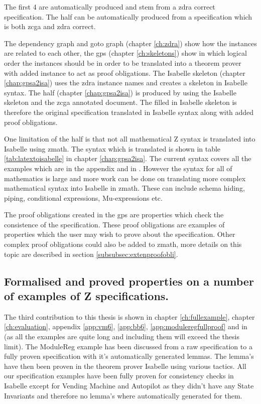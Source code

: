 The first 4 are automatically produced and stem from a \gls{zdra} correct
specification. The \gls{half} can be automatically produced from a specification
which is both \gls{zcga} and \gls{zdra} correct.

The dependency graph and goto graph (chapter \ref{ch:zdra}) show how the
instances are related to each other, the \gls{gps} (chapter \ref{ch:skeletons})
show in which logical order the instances should be in order to be translated
into a theorem prover with added instance to act as proof obligations. The
Isabelle skeleton (chapter \ref{chap:gpsa2isa}) uses the \gls{zdra} instance
names and creates a skeleton in Isabelle syntax. The \gls{half} (chapter
\ref{chap:gpsa2isa}) is produced by using the Isabelle skeleton and the
\gls{zcga} annotated document. The filled in Isabelle skeleton is therefore the
original specification translated in Isabelle syntax along with added proof
obligations.

One limitation of the \gls{half} is that not all mathematical Z syntax is
translated into Isabelle using \gls{zmath}. The syntax which is translated is
shown in table \ref{tab:latextoisabelle} in chapter \ref{chap:gpsa2isa}. The
current syntax covers all the examples which are in the appendix and in
\cite{mathlangexamples}. However the syntax for all of mathematics is large and
more work can be done on translating more complex mathematical syntax into
Isabelle in \gls{zmath}. These can include schema hiding, piping, conditional
expressions, Mu-expressions \cite{zrefcard} etc.

The proof obligations created in the \gls{gps} are properties which check the
consistence of the specification. These proof obligations are examples of
properties which the user may wish to prove about the specification. Other
complex proof obligations could also be added to \gls{zmath}, more details on
this topic are described in section \ref{subsubsec:extenproofobli}.

\subsection{Formalised and proved properties on a number of examples of Z
specifications.}

The third contribution to this thesis is shown in chapter \ref{ch:fullexample},
chapter \ref{ch:evaluation}, appendix \ref{app:vm6}, \ref{app:bb6},
\ref{app:moduleregfullproof} and in \cite{mathlangexamples} (as all the
examples are quite long and including them will exceed the thesis limit). The ModuleReg
example has been discussed from a raw specification to a fully proven
specification with it's automatically generated lemmas. The lemma's have then
been proven in the theorem prover Isabelle using various tactics. All our
specification examples have been fully proven for consistency checks in Isabelle
except for Vending Machine and Autopilot as they didn't have any State
Invariants and therefore no lemma's where automatically generated for them.

